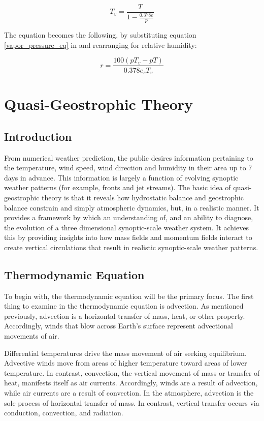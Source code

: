 \begin{equation}
    T_v = \frac{T}{1 - \frac{0.378 e}{p}}
\end{equation}

The equation becomes the following, by substituting equation \ref{vapor_pressure_eq} in and rearranging for relative humidity:

\begin{equation}
    r = \frac{100 (p T_v - p T)}{0.378 e_s T_v}
\end{equation}

\section{Quasi-Geostrophic Theory}
\subsection{Introduction}
From numerical weather prediction, the public desires information pertaining to the temperature, wind speed, wind direction and humidity in their area up to 7 days in advance. This information is largely a function of evolving synoptic weather patterns (for example, fronts and jet streams). The basic idea of quasi-geostrophic theory is that it reveals how hydrostatic balance and geostrophic balance constrain and simply atmospheric dynamics, but, in a realistic manner. It provides a framework by which an understanding of, and an ability to diagnose, the evolution of a three dimensional synoptic-scale weather system. It achieves this by providing insights into how mass fields and momentum fields interact to create vertical circulations that result in realistic synoptic-scale weather patterns.

\subsection{Thermodynamic Equation}\label{advection_equation}
To begin with, the thermodynamic equation will be the primary focus. The first thing to examine in the thermodynamic equation is advection. As mentioned previously, advection is a horizontal transfer of mass, heat, or other property. Accordingly, winds that blow across Earth's surface represent advectional movements of air. 

Differential temperatures drive the mass movement of air seeking equilibrium. Advective winds move from areas of higher temperature toward areas of lower temperature. In contrast, convection, the vertical movement of mass or transfer of heat, manifests itself as air currents. Accordingly, winds are a result of advection, while air currents are a result of convection. In the atmosphere, advection is the sole process of horizontal transfer of mass. In contrast, vertical transfer occurs via conduction, convection, and radiation.


